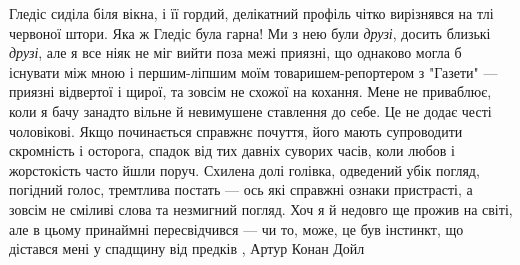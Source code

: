 Гледіс сиділа біля вікна, і її гордий, делікатний профіль чітко вирізнявся на
тлі червоної штори. Яка ж Гледіс була гарна! Ми з нею були \emph{друзі}, досить
близькі \emph{друзі}, але я все ніяк не міг вийти поза межі приязні, що однаково могла
б існувати між мною і першим-ліпшим моїм товаришем-репортером з "Газети" —
приязні відвертої і щирої, та зовсім не схожої на кохання. Мене не приваблює,
коли я бачу занадто вільне й невимушене ставлення до себе. Це не додає честі
чоловікові. Якщо починається справжнє почуття, його мають супроводити
скромність і осторога, спадок від тих давніх суворих часів, коли любов і
жорстокість часто йшли поруч. Схилена долі голівка, одведений убік погляд,
погідний голос, тремтлива постать — ось які справжні ознаки пристрасті, а
зовсім не сміливі слова та незмигний погляд. Хоч я й недовго ще прожив на
світі, але в цьому принаймні пересвідчився — чи то, може, це був інстинкт, що
дістався мені у спадщину від предків
, Артур Конан Дойл
